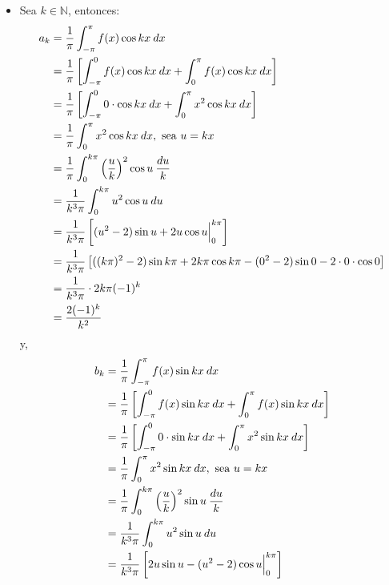 \documentclass[12pt]{report}
\newcounter{it}
\theoremstyle{largebreak}
\begin{document}
\begin{sol}
\begin{itemize}
            \item Sea $k\in\mathbb{N}$, entonces:
            \begin{equation*}
                \begin{split}
                    a_k&=\frac{1}{\pi}\int_{-\pi}^{\pi}f(x)\cos kx\:dx\\
                    &=\frac{1}{\pi}\left[\int_{-\pi}^{0}f(x)\cos kx\:dx+\int_{0}^{\pi}f(x)\cos kx\:dx\right] \\
                    &=\frac{1}{\pi}\left[\int_{-\pi}^{0}0\cdot\cos kx\:dx+\int_{0}^{\pi}x^2\cos kx\:dx\right]\\
                    &=\frac{1}{\pi}\int_{0}^{\pi}x^2\cos kx\:dx,\textup{ sea }u=kx \\
                    &=\frac{1}{\pi}\int_{0}^{k\pi}\left(\frac{u}{k}\right)^2\cos u\:\frac{du}{k}\\
                    &=\frac{1}{k^3\pi}\int_{0}^{k\pi}u^2\cos u\:du\\
                    &=\frac{1}{k^3\pi}\left[(u^2-2)\sin u+2u\cos u\Big|_{0}^{k\pi} \right]\\
                    &=\frac{1}{k^3\pi}\left[((k\pi)^2-2)\sin k\pi+2k\pi\cos k\pi-(0^2-2)\sin 0-2\cdot0\cdot\cos0\right]\\
                    &=\frac{1}{k^3\pi}\cdot2k\pi(-1)^{k}\\
                    &=\frac{2(-1)^{k}}{k^2}\\
                \end{split}
            \end{equation*}
            y,
            \begin{equation*}
                \begin{split}
                    b_k&=\frac{1}{\pi}\int_{-\pi}^{\pi}f(x)\sin kx\:dx\\
                    &=\frac{1}{\pi}\left[\int_{-\pi}^{0}f(x)\sin kx\:dx+\int_{0}^{\pi}f(x)\sin kx\:dx\right] \\
                    &=\frac{1}{\pi}\left[\int_{-\pi}^{0}0\cdot\sin kx\:dx+\int_{0}^{\pi}x^2\sin kx\:dx\right]\\
                    &=\frac{1}{\pi}\int_{0}^{\pi}x^2\sin kx\:dx,\textup{ sea }u=kx \\
                    &=\frac{1}{\pi}\int_{0}^{k\pi}\left(\frac{u}{k}\right)^2\sin u\:\frac{du}{k}\\
                    &=\frac{1}{k^3\pi}\int_{0}^{k\pi}u^2\sin u\:du\\
                    &=\frac{1}{k^3\pi}\left[2u\sin u-(u^2-2)\cos u\Big|_{0}^{k\pi}\right]\\

\end{split}
\end{equation*}
\end{itemize}
\end{sol}
\end{document}
